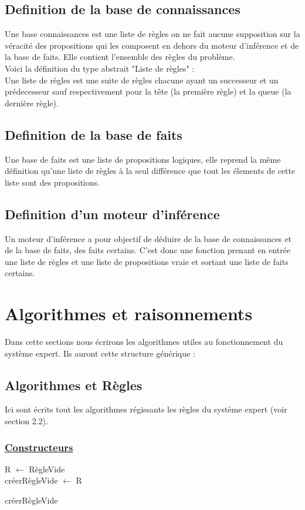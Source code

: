 \documentclass{article}
\begin{document}
\subsection{Definition de la base de connaissances}
Une base connaissances est une liste de règles on ne fait aucune supposition sur la véracité des propositions qui les composent en dehors du moteur d'inférence et de la base de faits.
Elle contient l'ensemble des règles du problème.
\\Voici la définition du type abstrait "Liste de règles" : \\
Une liste de règles est une suite de règles chacune ayant un successeur et un prédecesseur sauf respectivement pour la tête (la première règle) et la queue (la dernière règle).\\

\subsection{Definition de la base de faits}
Une base de faits est une liste de propositions logiques, elle reprend la même définition qu'une liste de règles à la seul différence que tout les élements de cette liste sont des propositions.

\subsection{Definition d'un moteur d'inférence}
Un moteur d'inférence a pour objectif de déduire de la base de connaissances et de la base de faits, des faits certains.
C'est donc une fonction prenant en entrée une liste de règles et une liste de propositions vraie et sortant une liste de faits certains.
\clearpage
\section{Algorithmes et raisonnements}
Dans cette sections nous écrirons les algorithmes utiles au fonctionnement du système expert. Ils auront cette structure générique : 

\subsection{Algorithmes et Règles}
Ici sont écrits tout les algorithmes régissants les règles du système expert (voir section 2.2).
\subsubsection{\underline{Constructeurs}}
\begin{algorithm}
    \SetAlgoLined
    R $\longleftarrow$ RègleVide\\
    créerRègleVide $\longleftarrow$ R 
    \caption{créerRègleVide}
\end{algorithm}
\end{document}
